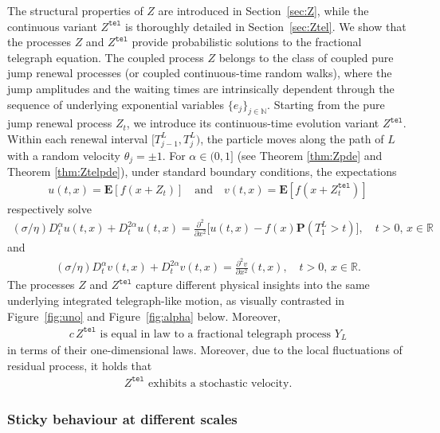 \documentclass[10pt,a4paper]{article}
\numberwithin{equation}{section}
\theoremstyle{plain}
\theoremstyle{remark}
\begin{document}
The structural properties of $Z$ are introduced in Section~\ref{sec:Z}, while the continuous variant $Z^\mathtt{tel}$ is thoroughly detailed in Section~\ref{sec:Ztel}. We show that the processes $Z$ and $Z^\mathtt{tel}$ provide probabilistic solutions to the fractional telegraph equation. The coupled process $Z$ belongs to the class of coupled pure jump renewal processes (or coupled continuous-time random walks), where the jump amplitudes and the waiting times are intrinsically dependent through the sequence of underlying exponential variables $\{e_j\}_{j \in \mathbb{N}}$. Starting from the pure jump renewal process $Z_t$, we introduce its continuous-time evolution variant $Z^\mathtt{tel}$.  Within each renewal interval $[T^L_{j-1}, T^L_j)$, the particle moves along the path of $L$ with a random velocity $\theta_j = \pm 1$. For $\alpha \in (0,1]$ (see Theorem \ref{thm:Zpde} and Theorem \ref{thm:Ztelpde}), under standard boundary conditions, the expectations
\begin{align*}
u(t,x) = \mathbf{E}[f(x + Z_t)] \quad \textrm{and} \quad v(t,x) = \mathbf{E}[f(x + Z^\mathtt{tel}_t)]
\end{align*}
respectively solve
\begin{align*}
(\sigma/\eta) D^\alpha_t u(t,x)  + D^{2\alpha}_t u(t,x) = \frac{\partial^2}{\partial x^2} \bigg[ u(t,x) - f(x) \mathbf{P}(T^L_1 > t) \bigg], \quad t>0,\, x \in \mathbb{R}
\end{align*}
and 
\begin{align*}
(\sigma/\eta) D^\alpha_t v(t,x)  + D^{2\alpha}_t v(t,x) = \frac{\partial^2 v}{\partial x^2}(t,x), \quad t>0,\, x \in \mathbb{R}.
\end{align*}
The processes $Z$ and $Z^\mathtt{tel}$ capture different physical insights into the same underlying integrated telegraph-like motion, as visually contrasted in Figure~\ref{fig:uno} and Figure~\ref{fig:alpha} below. Moreover, 
\begin{align*}
c \, Z^\mathtt{tel} \textrm{ is equal in law to a fractional telegraph process $Y_{L}$}
\end{align*} 
in terms of their one-dimensional laws. Moreover, due to the local fluctuations of residual process, it holds that 
\begin{align*}
Z^\mathtt{tel} \textrm{ exhibits a stochastic velocity}.
\end{align*} 
 
\subsubsection{Sticky behaviour at different scales}
\end{document}
